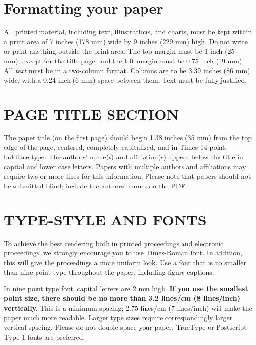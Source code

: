 \documentclass{article}
\begin{document}
\section{Formatting your paper}
\label{sec:format}

All printed material, including text, illustrations, and charts, must be kept
within a print area of 7 inches (178 mm) wide by 9 inches (229 mm) high. Do
not write or print anything outside the print area. The top margin must be 1
inch (25 mm), except for the title page, and the left margin must be 0.75 inch
(19 mm).  All {\it text} must be in a two-column format. Columns are to be 3.39
inches (86 mm) wide, with a 0.24 inch (6 mm) space between them. Text must be
fully justified.

\section{PAGE TITLE SECTION}
\label{sec:pagestyle}

The paper title (on the first page) should begin 1.38 inches (35 mm) from the
top edge of the page, centered, completely capitalized, and in Times 14-point,
boldface type.  The authors' name(s) and affiliation(s) appear below the title
in capital and lower case letters.  Papers with multiple authors and
affiliations may require two or more lines for this information. Please note
that papers should not be submitted blind; include the authors' names on the
PDF.

\section{TYPE-STYLE AND FONTS}
\label{sec:typestyle}

To achieve the best rendering both in printed proceedings and electronic proceedings, we
strongly encourage you to use Times-Roman font.  In addition, this will give
the proceedings a more uniform look.  Use a font that is no smaller than nine
point type throughout the paper, including figure captions.

In nine point type font, capital letters are 2 mm high.  {\bf If you use the
smallest point size, there should be no more than 3.2 lines/cm (8 lines/inch)
vertically.}  This is a minimum spacing; 2.75 lines/cm (7 lines/inch) will make
the paper much more readable.  Larger type sizes require correspondingly larger
vertical spacing.  Please do not double-space your paper.  TrueType or
Postscript Type 1 fonts are preferred.
\end{document}
